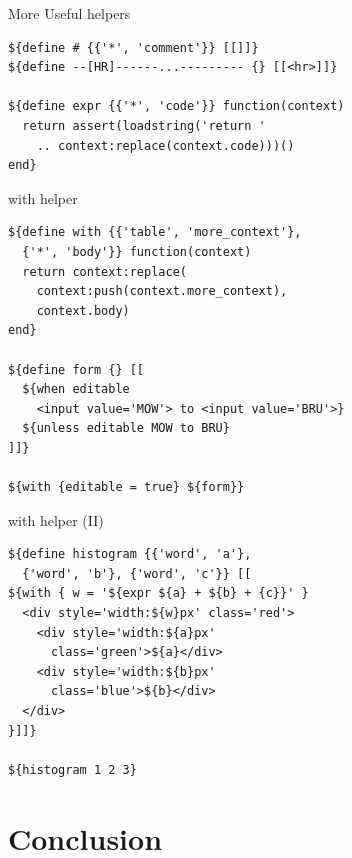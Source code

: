 \documentclass[aspectratio=43,handout,bigger]{beamer}
\begin{document}

\begin{frame}[fragile]{More Useful helpers}
\begin{verbatim}
${define # {{'*', 'comment'}} [[]]}
${define --[HR]------...--------- {} [[<hr>]]}

${define expr {{'*', 'code'}} function(context)
  return assert(loadstring('return '
    .. context:replace(context.code)))()
end}
\end{verbatim}
\end{frame}


\begin{frame}[fragile]{with helper}
\begin{verbatim}
${define with {{'table', 'more_context'},
  {'*', 'body'}} function(context)
  return context:replace(
    context:push(context.more_context),
    context.body)
end}

${define form {} [[
  ${when editable
    <input value='MOW'> to <input value='BRU'>}
  ${unless editable MOW to BRU}
]]}

${with {editable = true} ${form}}
\end{verbatim}
\end{frame}


\begin{frame}[fragile]{with helper (II)}
\begin{verbatim}
${define histogram {{'word', 'a'},
  {'word', 'b'}, {'word', 'c'}} [[
${with { w = '${expr ${a} + ${b} + {c}}' }
  <div style='width:${w}px' class='red'>
    <div style='width:${a}px'
      class='green'>${a}</div>
    <div style='width:${b}px'
      class='blue'>${b}</div>
  </div>
}]]}

${histogram 1 2 3}
\end{verbatim}
\end{frame}

\section{Conclusion}
\end{document}
